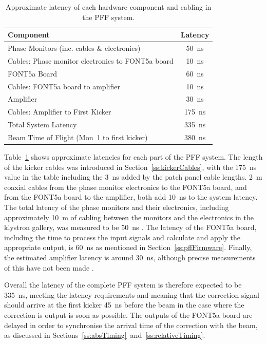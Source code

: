 \begin{table}
  \begin{center}
    \begin{tabular}{| l c |}
	   \hline
       Component & Latency \\ \hline
       Phase Monitors (inc. cables \& electronics) & 50~ns \\
	   Cables: Phase monitor electronics to FONT5a board & 10~ns \\
	   FONT5a Board & 60~ns \\
	   Cables: FONT5a board to amplifier & 10~ns \\
	   Amplifier & 30~ns \\
	   Cables: Amplifier to First Kicker & 175~ns \\ \hline
	   Total System Latency & 335~ns \\
	   Beam Time of Flight (Mon~1 to first kicker) & 380~ns \\ \hline   
    \end{tabular}
    \caption{Approximate latency of each hardware component and cabling in the PFF system.}
  	\label{t:systLatency}
  \end{center}
\end{table}


Table~\ref{t:systLatency} shows approximate latencies for each part of the PFF system. The length of the kicker cables was introduced in Section~\ref{ss:kickerCables}, with the 175~ns value in the table including the 3~ns added by the patch panel cable lengths. 2~m coaxial cables from the phase monitor electronics to the FONT5a board, and from the FONT5a board to the amplifier, both add 10~ns to the system latency. The total latency of the phase monitors and their electronics, including approximately 10~m of cabling between the monitors and the electronics in the klystron gallery, was measured to be 50~ns \cite{alexPriv}. The latency of the FONT5a board, including the time to process the input signals and calculate and apply the appropriate output, is 60~ns as mentioned in Section~\ref{ss:pffFirmware}. Finally, the estimated amplifier latency is around 30~ns, although precise measurements of this have not been made \cite{colinPriv}.

Overall the latency of the complete PFF system is therefore expected to be 335~ns, meeting the latency requirements and meaning that the correction signal should arrive at the first kicker 45~ns before the beam in the case where the correction is output is soon as possible. The outputs of the FONT5a board are delayed in order to synchronise the arrival time of the correction with the beam, as discussed in Sections~\ref{ss:absTiming}~and~\ref{ss:relativeTiming}.

